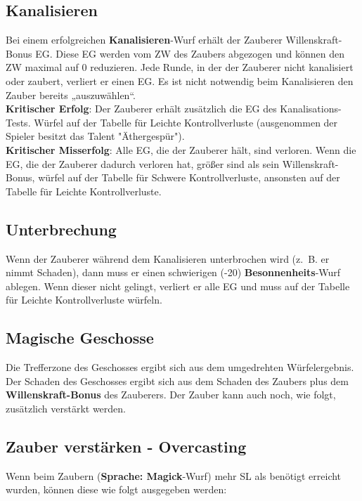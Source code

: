 \documentclass[a4paper,10pt,twoside,twocolumn,openany,nodeprecatedcode,bg=print]{dndbook}
\begin{document}
\subsection{Kanalisieren}
Bei einem erfolgreichen \textbf{Kanalisieren}-Wurf erhält der Zauberer Willenskraft-Bonus EG. Diese EG werden vom ZW des Zaubers abgezogen und können den ZW maximal auf 0 reduzieren.
Jede Runde, in der der Zauberer nicht kanalisiert oder zaubert, verliert er einen EG.
Es ist nicht notwendig beim Kanalisieren den Zauber bereits „auszuwählen“.\\
\textbf{Kritischer Erfolg}: Der Zauberer erhält zusätzlich die EG des Kanalisations-Tests. Würfel auf der Tabelle für Leichte Kontrollverluste (ausgenommen der Spieler besitzt das Talent "Äthergespür").\\
\textbf{Kritischer Misserfolg}: Alle EG, die der Zauberer hält, sind verloren. Wenn die EG, die der Zauberer dadurch verloren hat, größer sind als sein Willenskraft-Bonus, würfel auf der Tabelle für Schwere Kontrollverluste, ansonsten auf der Tabelle für Leichte Kontrollverluste.

\subsection{Unterbrechung}
Wenn der Zauberer während dem Kanalisieren unterbrochen wird (z. B. er nimmt Schaden), dann muss er einen schwierigen (-20) \textbf{Besonnenheits}-Wurf ablegen. Wenn dieser nicht gelingt, verliert er alle EG und muss auf der Tabelle für Leichte Kontrollverluste würfeln.

\subsection{Magische Geschosse}
Die Trefferzone des Geschosses ergibt sich aus dem umgedrehten Würfelergebnis.\\
Der Schaden des Geschosses ergibt sich aus dem Schaden des Zaubers plus dem \textbf{Willenskraft-Bonus} des Zauberers.
Der Zauber kann auch noch, wie folgt, zusätzlich verstärkt werden.

\subsection{Zauber verstärken - Overcasting}
Wenn beim Zaubern (\textbf{Sprache: Magick}-Wurf) mehr SL als benötigt erreicht wurden, können diese wie folgt ausgegeben werden:
\end{document}
